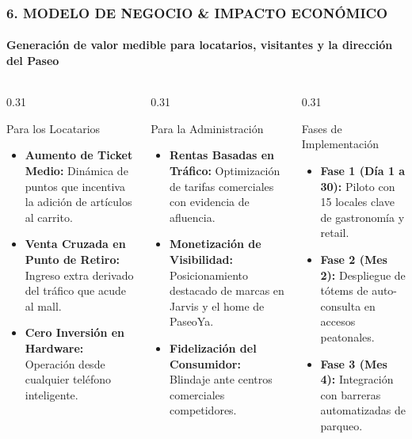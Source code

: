 \documentclass[aspectratio=169, 10pt]{beamer}
\begin{document}
\begin{frame}
  \frametitle{6. MODELO DE NEGOCIO \& IMPACTO ECONÓMICO}
  \framesubtitle{Generación de valor medible para locatarios, visitantes y la dirección del Paseo}

  \begin{columns}[T]
    \begin{column}{0.31\textwidth}
      \begin{alertblock}{Para los Locatarios}
        \scriptsize
        \begin{itemize}\setlength\itemsep{0.25em}
          \item \textbf{Aumento de Ticket Medio:} Dinámica de puntos que incentiva la adición de artículos al carrito.
          \item \textbf{Venta Cruzada en Punto de Retiro:} Ingreso extra derivado del tráfico que acude al mall.
          \item \textbf{Cero Inversión en Hardware:} Operación desde cualquier teléfono inteligente.
        \end{itemize}
      \end{alertblock}
    \end{column}

    \begin{column}{0.31\textwidth}
      \begin{block}{Para la Administración}
        \scriptsize
        \begin{itemize}\setlength\itemsep{0.25em}
          \item \textbf{Rentas Basadas en Tráfico:} Optimización de tarifas comerciales con evidencia de afluencia.
          \item \textbf{Monetización de Visibilidad:} Posicionamiento destacado de marcas en Jarvis y el home de PaseoYa.
          \item \textbf{Fidelización del Consumidor:} Blindaje ante centros comerciales competidores.
        \end{itemize}
      \end{block}
    \end{column}

    \begin{column}{0.31\textwidth}
      \begin{exampleblock}{Fases de Implementación}
        \scriptsize
        \begin{itemize}\setlength\itemsep{0.25em}
          \item \textbf{Fase 1 (Día 1 a 30):} Piloto con 15 locales clave de gastronomía y retail.
          \item \textbf{Fase 2 (Mes 2):} Despliegue de tótems de auto-consulta en accesos peatonales.
          \item \textbf{Fase 3 (Mes 4):} Integración con barreras automatizadas de parqueo.
        \end{itemize}
      \end{exampleblock}
    \end{column}
  \end{columns}


\end{frame}
\end{document}
